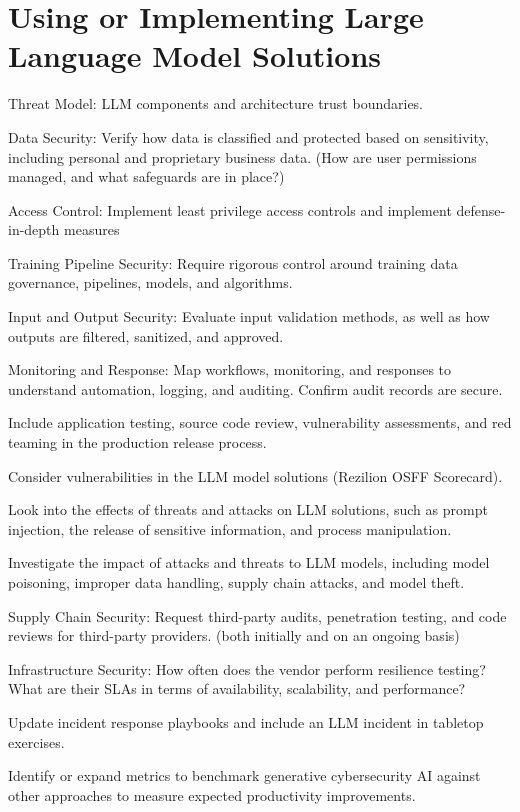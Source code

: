 \section{Using or Implementing Large Language Model Solutions}
\begin{minipage}{\linewidth}
\begin{checklist}
  \item Threat Model: LLM components and architecture trust boundaries.
  \item Data Security: Verify how data is classified and protected based on sensitivity, including personal and proprietary business data. (How are user permissions managed, and what safeguards are in place?)
  \item Access Control: Implement least privilege access controls and implement defense-in-depth measures
  \item Training Pipeline Security: Require rigorous control around training data governance, pipelines, models, and algorithms.
  \item Input and Output Security: Evaluate input validation methods, as well as how outputs are filtered, sanitized, and approved.
  \item Monitoring and Response: Map workflows, monitoring, and responses to understand automation, logging, and auditing. Confirm audit records are secure.
  \item Include application testing, source code review, vulnerability assessments, and red teaming in the production release process.
  \item Consider vulnerabilities in the LLM model solutions (Rezilion OSFF Scorecard).
  \item Look into the effects of threats and attacks on LLM solutions, such as prompt injection, the release of sensitive information, and process manipulation.
  \item Investigate the impact of attacks and threats to LLM models, including model poisoning, improper data handling, supply chain attacks, and model theft.
  \item Supply Chain Security: Request third-party audits, penetration testing, and code reviews for third-party providers. (both initially and on an ongoing basis)
  \item Infrastructure Security: How often does the vendor perform resilience testing? What are their SLAs in terms of availability, scalability, and performance?
  \item Update incident response playbooks and include an LLM incident in tabletop exercises.
  \item Identify or expand metrics to benchmark generative cybersecurity AI against other approaches to measure expected productivity improvements.
\end{checklist}
\end{minipage}